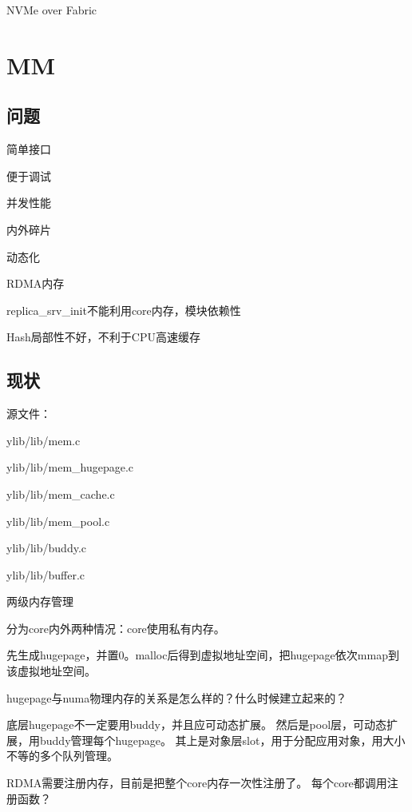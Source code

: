 NVMe over Fabric

\section{MM}

\subsection{问题}

\begin{enumbox}
\item 简单接口
\item 便于调试
\item 并发性能
\item 内外碎片
\item 动态化
\item RDMA内存
\item replica\_srv\_init不能利用core内存，模块依赖性
\item Hash局部性不好，不利于CPU高速缓存
\end{enumbox}

\subsection{现状}

源文件：
\begin{enumbox}
\item ylib/lib/mem.c
\item ylib/lib/mem\_hugepage.c
\item ylib/lib/mem\_cache.c
\item ylib/lib/mem\_pool.c
\item ylib/lib/buddy.c
\item ylib/lib/buffer.c
\end{enumbox}

两级内存管理

分为core内外两种情况：core使用私有内存。

先生成hugepage，并置0。malloc后得到虚拟地址空间，把hugepage依次mmap到该虚拟地址空间。

hugepage与numa物理内存的关系是怎么样的？什么时候建立起来的？

底层hugepage不一定要用buddy，并且应可动态扩展。
然后是pool层，可动态扩展，用buddy管理每个hugepage。
其上是对象层slot，用于分配应用对象，用大小不等的多个队列管理。

RDMA需要注册内存，目前是把整个core内存一次性注册了。
每个core都调用注册函数？


